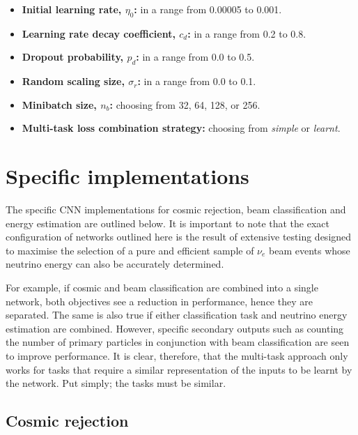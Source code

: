\begin{itemize}
    \item \textbf{Initial learning rate, $\eta_{0}$:} in a range from 0.00005 to 0.001.
    \item \textbf{Learning rate decay coefficient, $c_{d}$:} in a range from 0.2 to 0.8.
    \item \textbf{Dropout probability, $p_{d}$:} in a range from 0.0 to 0.5.
    \item \textbf{Random scaling size, $\sigma_{r}$:} in a range from 0.0 to 0.1.
    \item \textbf{Minibatch size, $n_{b}$:} choosing from 32, 64, 128, or 256.
    \item \textbf{Multi-task loss combination strategy:} choosing from \emph{simple} or
          \emph{learnt}.
\end{itemize}

\section{Specific implementations} %
\label{sec:cvn_specific} %

The specific CNN implementations for cosmic rejection, beam classification and energy estimation
are outlined below. It is important to note that the exact configuration of networks outlined here
is the result of extensive testing designed to maximise the selection of a pure and efficient
sample of $\nu_{e}$ beam events whose neutrino energy can also be accurately determined.

For example, if cosmic and beam classification are combined into a single network, both objectives
see a reduction in performance, hence they are separated. The same is also true if either
classification task and neutrino energy estimation are combined. However, specific secondary
outputs such as counting the number of primary particles in conjunction with beam classification
are seen to improve performance. It is clear, therefore, that the multi-task approach only works
for tasks that require a similar representation of the inputs to be learnt by the network. Put
simply; the tasks must be similar.

\subsection{Cosmic rejection} %
\label{sec:cvn_specific_cosmic} %

